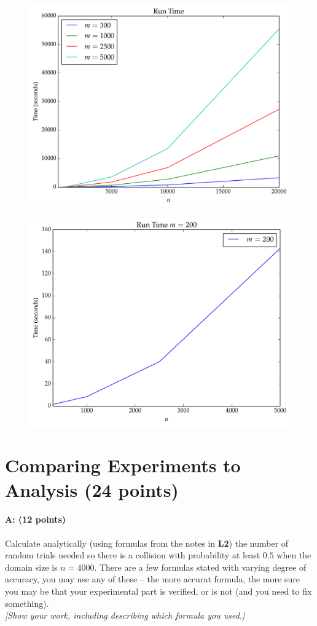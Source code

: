 \documentclass[11pt]{article}
\begin{document}
\begin{figure}
\centering
\includegraphics[width=.75\textwidth]{prob2_runtime.pdf}
\end{figure}

\begin{figure}
\centering
\includegraphics[width=.75\textwidth]{prob2_runtime-m300.pdf}
\end{figure}


\section{Comparing Experiments to Analysis (24 points)}

\paragraph{A: (12 points)}
Calculate analytically (using formulas from the notes in \textbf{L2}) the number of random trials needed so there is a collision with probability at least $0.5$ when the domain size is $n = 4000$.  There are a few formulas stated with varying degree of accuracy, you may use any of these -- the more accurat formula, the more sure you may be that your experimental part is verified, or is not (and you need to fix something).  
\\ \emph{[Show your work, including describing which formula you used.]}
\end{document}
